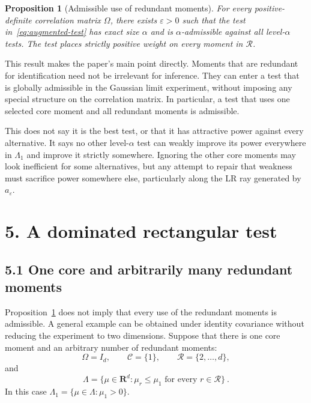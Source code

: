 \documentclass[12pt]{article}
\newtheorem{proposition}{Proposition}
\theoremstyle{remark}
\begin{document}
\begin{proposition}[Admissible use of redundant moments]\label{prop:existence}
For every positive-definite correlation matrix $\Omega$, there exists $\varepsilon>0$ such that the test in~\eqref{eq:augmented-test} has exact size $\alpha$ and is $\alpha$-admissible against all level-$\alpha$ tests.  The test places strictly positive weight on every moment in $\mathcal R$.
\end{proposition}

This result makes the paper's main point directly.  Moments that are redundant for identification need not be irrelevant for inference.  They can enter a test that is globally admissible in the Gaussian limit experiment, without imposing any special structure on the correlation matrix. In particular, a test that uses one selected core moment and all redundant moments is admissible.

This does not say it is the best test, or that it has attractive power against every alternative. It says no other level-\(\alpha\) test can weakly improve its power everywhere in \(\Lambda_1\) and improve it strictly somewhere. Ignoring the other core moments may look inefficient for some alternatives, but any attempt to repair that weakness must sacrifice power somewhere else, particularly along the LR ray generated by \(a_\varepsilon\).

\section*{5. A dominated rectangular test}

\subsection*{5.1 One core and arbitrarily many redundant moments}

Proposition~\ref{prop:existence} does not imply that every use of the redundant
moments is admissible.  A general example can be obtained under identity
covariance without reducing the experiment to two dimensions.  Suppose that
there is one core moment and an arbitrary number of redundant moments:
\[
\Omega=I_d,
\qquad
\mathcal C=\{1\},
\qquad
\mathcal R=\{2,\ldots,d\},
\]
and
\[
\Lambda
=
\{\mu\in\mathbf R^d:\mu_r\le\mu_1
  \text{ for every }r\in\mathcal R\}~.
\]
In this case $\Lambda_1=\{\mu\in\Lambda:\mu_1>0\}$.
\end{document}
